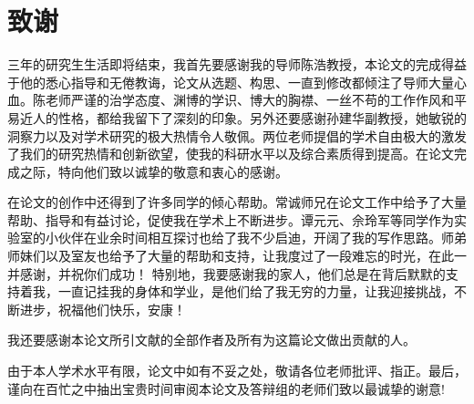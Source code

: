 \chapter*{致\quad 谢}


三年的研究生生活即将结束，我首先要感谢我的导师陈浩教授，本论文的完成得益于他的悉心指导和无倦教诲，论文从选题、构思、一直到修改都倾注了导师大量心血。陈老师严谨的治学态度、渊博的学识、博大的胸襟、一丝不苟的工作作风和平易近人的性格，都给我留下了深刻的印象。另外还要感谢孙建华副教授，她敏锐的洞察力以及对学术研究的极大热情令人敬佩。两位老师提倡的学术自由极大的激发了我们的研究热情和创新欲望，使我的科研水平以及综合素质得到提高。在论文完成之际，特向他们致以诚挚的敬意和衷心的感谢。

在论文的创作中还得到了许多同学的倾心帮助。常诚师兄在论文工作中给予了大量帮助、指导和有益讨论，促使我在学术上不断进步。谭元元、佘玲军等同学作为实验室的小伙伴在业余时间相互探讨也给了我不少启迪，开阔了我的写作思路。师弟师妹们以及室友也给予了大量的帮助和支持，让我度过了一段难忘的时光，在此一并感谢，并祝你们成功！ 
特别地，我要感谢我的家人，他们总是在背后默默的支持着我，一直记挂我的身体和学业，是他们给了我无穷的力量，让我迎接挑战，不断进步，祝福他们快乐，安康！ 

我还要感谢本论文所引文献的全部作者及所有为这篇论文做出贡献的人。

由于本人学术水平有限，论文中如有不妥之处，敬请各位老师批评、指正。最后，谨向在百忙之中抽出宝贵时间审阅本论文及答辩组的老师们致以最诚挚的谢意!

